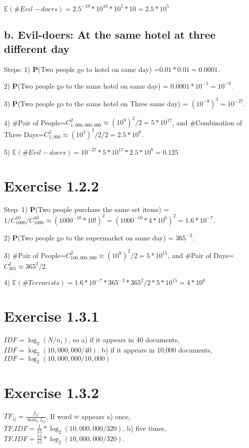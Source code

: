 \documentclass{article}
\begin{document}
$\mathbb{E}(\#Evil-doers)=2.5^{-19} * 10^{18}*10^{5}*10=2.5*10^{5}$

\subsection{b. Evil-doers: At the same hotel at three different day}
Steps: 
1) \textbf{P}(Two people go to hotel on same day) =$ 0.01 * 0.01 =0.0001$.

2) \textbf{P}(Two people go to the same hotel on same day) = $0.0001 * 10^{-5}=10^{-9}$. 

3) \textbf{P}(Two people go to the same hotel on Three same day) = $(10^{-9})^3 = 10^{-27}$.

4) \#Pair of People=$C^2_{1,000,000,000}\approx (10^9)^2/2=5*10^{17}$, and \#Combination of Three Days=$C^3_{1,000}\approx (10^3)^3/2/2=2.5*10^{8}$. 

 5) $\mathbb{E}(\#Evil-doers)=10^{-27} *5* 10^{17}*2.5*10^{8}=0.125$
 
\section{Exercise 1.2.2}

Step:
1) \textbf{P}(Two people purchase the same set items) =$ 1 / C^{10}_{1000} / C^{10}_{1000} \approx (1000^{-10}*10!)^2=(1000^{-10}*4*10^{6})^2=1.6*10^{-7}$.

2) \textbf{P}(Two people go to the supermarket on same day) = $365^{-2}$. 

3) \#Pair of People=$C^2_{100,000,000}\approx (10^8)^2/2=5*10^{15}$, and \#Pair of Days=$C^2_{365}\approx 365^2/2$. 

4) $\mathbb{E}(\#Terrorists)=1.6*10^{-7}*365^{-2}*365^2/2*5*10^{15}=4*10^{8}$

\section{Exercise 1.3.1}

$IDF = \log_2(N/n_i)$, so a) if it appears in 40 documents, $IDF = \log_2(10,000,000/40)$. b) if it appears in 10,000 documents, $IDF = \log_2(10,000,000/10,000)$

\section{Exercise 1.3.2}

$TF_{ij} = \frac{f_{ij}}{\max_kf_{kj}}$. If word $w$ appears a) once, $TF.IDF = \frac{1}{15} * \log_2(10,000,000/320)$, b) five times, $TF.IDF = \frac{15}{15} * \log_2(10,000,000/320)$. 
\end{document}
